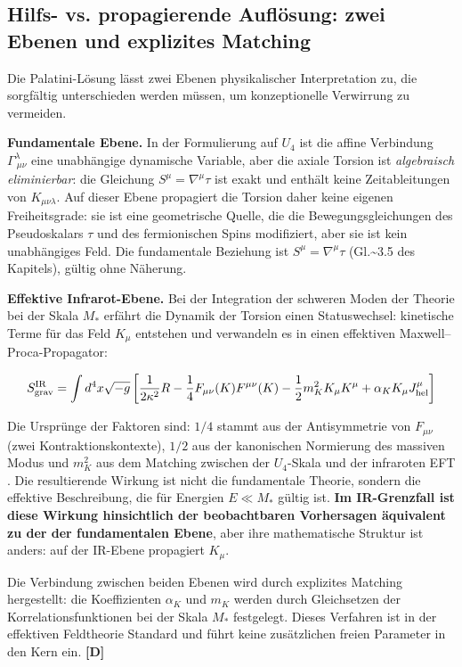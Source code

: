 ﻿\documentclass[11pt,letterpaper]{article}
\begin{document}
\subsection{Hilfs- vs. propagierende Auflösung: zwei Ebenen und explizites Matching}
Die Palatini-Lösung lässt zwei Ebenen physikalischer Interpretation zu, die sorgfältig unterschieden werden müssen, um konzeptionelle Verwirrung zu vermeiden.

\textbf{Fundamentale Ebene.} In der Formulierung auf $U_4$ ist die affine Verbindung $\Gamma^\lambda_{\ \mu\nu}$ eine unabhängige dynamische Variable, aber die axiale Torsion ist \emph{algebraisch eliminierbar}: die Gleichung $S^\mu = \nabla^\mu\tau$ ist exakt und enthält keine Zeitableitungen von $K_{\mu\nu\lambda}$. Auf dieser Ebene propagiert die Torsion daher keine eigenen Freiheitsgrade: sie ist eine geometrische Quelle, die die Bewegungsgleichungen des Pseudoskalars $\tau$ und des fermionischen Spins modifiziert, aber sie ist kein unabhängiges Feld. Die fundamentale Beziehung ist $S^\mu = \nabla^\mu\tau$ (Gl.\textasciitilde{}3.5 des Kapitels), gültig ohne Näherung.

\textbf{Effektive Infrarot-Ebene.} Bei der Integration der schweren Moden der Theorie bei der Skala $M_*$ erfährt die Dynamik der Torsion einen Statuswechsel: kinetische Terme für das Feld $K_\mu$ entstehen und verwandeln es in einen effektiven Maxwell--Proca-Propagator:

\begin{equation*}
  \resizebox{\ifdim\width>\linewidth \linewidth\else\width\fi}{!}{$\displaystyle S_{\text{grav}}^{\text{IR}} = \int d^4x\sqrt{-g}\left[\frac{1}{2\kappa^2}R - \frac{1}{4}F_{\mu\nu}(K)F^{\mu\nu}(K) - \frac{1}{2}m_K^2 K_\mu K^\mu + \alpha_K K_\mu J_{\text{hel}}^\mu\right]$}
\end{equation*}

Die Ursprünge der Faktoren sind: $1/4$ stammt aus der Antisymmetrie von $F_{\mu\nu}$ (zwei Kontraktionskontexte), $1/2$ aus der kanonischen Normierung des massiven Modus und $m_K^2$ aus dem Matching zwischen der $U_4$-Skala und der infraroten EFT \cite{Tomboulis2015}. Die resultierende Wirkung ist nicht die fundamentale Theorie, sondern die effektive Beschreibung, die für Energien $E \ll M_*$ gültig ist. \textbf{Im IR-Grenzfall ist diese Wirkung hinsichtlich der beobachtbaren Vorhersagen äquivalent zu der der fundamentalen Ebene}, aber ihre mathematische Struktur ist anders: auf der IR-Ebene propagiert $K_\mu$.

Die Verbindung zwischen beiden Ebenen wird durch explizites Matching hergestellt: die Koeffizienten $\alpha_K$ und $m_K$ werden durch Gleichsetzen der Korrelationsfunktionen bei der Skala $M_*$ festgelegt. Dieses Verfahren ist in der effektiven Feldtheorie Standard und führt keine zusätzlichen freien Parameter in den Kern ein. \textbf{[D]}
\end{document}

